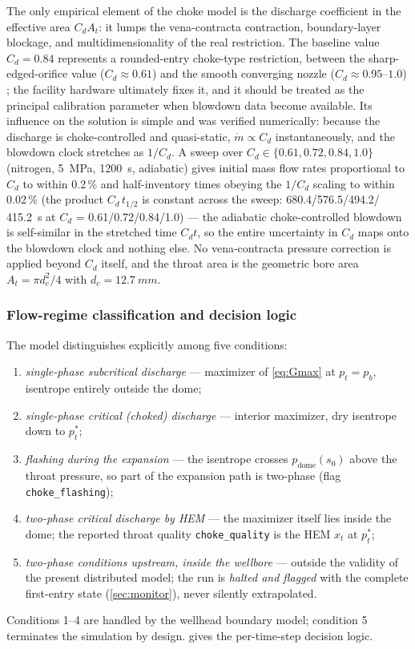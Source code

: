 \documentclass[11pt]{article}
\newcommand{\mdot}{\dot{m}}
\begin{document}
The only empirical element of the choke model is the discharge
coefficient in the effective area $C_d A_t$: it lumps the
vena-contracta contraction, boundary-layer blockage, and
multidimensionality of the real restriction. The baseline value
$C_d = 0.84$ represents a rounded-entry choke-type restriction,
between the sharp-edged-orifice value ($C_d \approx 0.61$) and the
smooth converging nozzle ($C_d \approx 0.95$--$1.0$)
\citep{perry2008}; the facility hardware ultimately fixes it, and it
should be treated as the principal calibration parameter when
blowdown data become available. Its influence on the solution is
simple and was verified numerically: because the discharge is
choke-controlled and quasi-static, $\mdot \propto C_d$
instantaneously, and the blowdown clock stretches as $1/C_d$.
A sweep over $C_d \in \{0.61, 0.72, 0.84, 1.0\}$ (nitrogen,
\SI{5}{MPa}, \SI{1200}{s}, adiabatic) gives initial mass flow rates
proportional to $C_d$ to within 0.2\,\% and half-inventory times
obeying the $1/C_d$ scaling to within 0.02\,\% (the product
$C_d\,t_{1/2}$ is constant across the sweep: 680.4/576.5/494.2/
\SI{415.2}{s} at $C_d$ = 0.61/0.72/0.84/1.0) --- the adiabatic
choke-controlled blowdown is self-similar in the stretched time
$C_d t$, so the entire uncertainty in $C_d$ maps onto the blowdown
clock and nothing else. No vena-contracta pressure correction is applied
beyond $C_d$ itself, and the throat area is the geometric bore area
$A_t = \pi d_c^2/4$ with $d_c = \SI{12.7}{mm}$.

\subsubsection{Flow-regime classification and decision logic}
\label{sec:hem-logic}

The model distinguishes explicitly among five conditions:
\begin{enumerate}
\item \emph{single-phase subcritical discharge} --- maximizer of
\cref{eq:Gmax} at $p_t = p_b$, isentrope entirely outside the dome;
\item \emph{single-phase critical (choked) discharge} --- interior
maximizer, dry isentrope down to $p_t^*$;
\item \emph{flashing during the expansion} --- the isentrope crosses
$p_{\mathrm{dome}}(s_0)$ above the throat pressure, so part of the
expansion path is two-phase (flag \texttt{choke\_flashing});
\item \emph{two-phase critical discharge by HEM} --- the maximizer
itself lies inside the dome; the reported throat quality
\texttt{choke\_quality} is the HEM $x_t$ at $p_t^*$;
\item \emph{two-phase conditions upstream, inside the wellbore} ---
outside the validity of the present distributed model; the run is
\emph{halted and flagged} with the complete first-entry state
(\cref{sec:monitor}), never silently extrapolated.
\end{enumerate}
Conditions 1--4 are handled by the wellhead boundary model; condition
5 terminates the simulation by design.  gives the
per-time-step decision logic.
\end{document}
